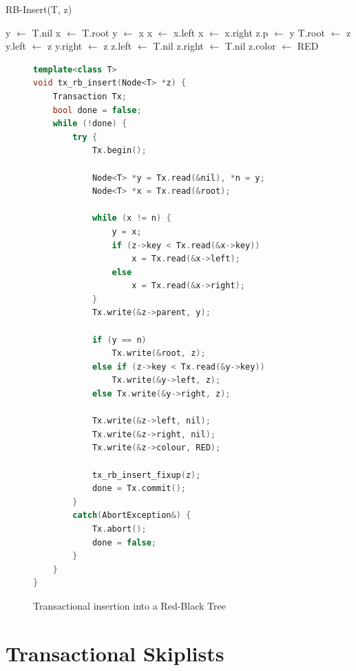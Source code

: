 \begin{algorithm}
\caption{RB-Insert(T, z)}
\label{alg:insert}
\begin{algorithmic}[1]
    \State y $\gets$ T.nil
    \State x $\gets$ T.root
        \State y $\gets$ x
            \State x $\gets$ x.left
        \Else 
            \State x $\gets$ x.right
        \EndIf
    \EndWhile
    \State z.p $\gets$ y
        \State T.root $\gets$ z
        \State y.left $\gets$ z
    \Else
        \State y.right $\gets$ z
    \EndIf
    \State z.left $\gets$ T.nil
    \State z.right $\gets$ T.nil
    \State z.color $\gets$ RED
    \State {}
\end{algorithmic}
\end{algorithm}

\begin{figure}[!htb]
\begin{lstlisting}[language=C++, escapeinside=``]
template<class T> 
void tx_rb_insert(Node<T> *z) {
    Transaction Tx;
    bool done = false;
    while (!done) {
        try {
            Tx.begin();

            Node<T> *y = Tx.read(&nil), *n = y;
            Node<T> *x = Tx.read(&root);
        
            while (x != n) {
                y = x;
                if (z->key < Tx.read(&x->key))
                    x = Tx.read(&x->left);
                else 
                    x = Tx.read(&x->right);
            }
            Tx.write(&z->parent, y);
            
            if (y == n) 
                Tx.write(&root, z);
            else if (z->key < Tx.read(&y->key)) 
                Tx.write(&y->left, z);
            else Tx.write(&y->right, z);
        
            Tx.write(&z->left, nil);
            Tx.write(&z->right, nil);
            Tx.write(&z->colour, RED);
        
            tx_rb_insert_fixup(z);
            done = Tx.commit();
        }
        catch(AbortException&) {
            Tx.abort();
            done = false;
        }
    }
}
\end{lstlisting}
\caption{Transactional insertion into a Red-Black Tree}
\label{fig:tx_insert}
\end{figure}

\FloatBarrier
\section{Transactional Skiplists}
\label{section:skip}

